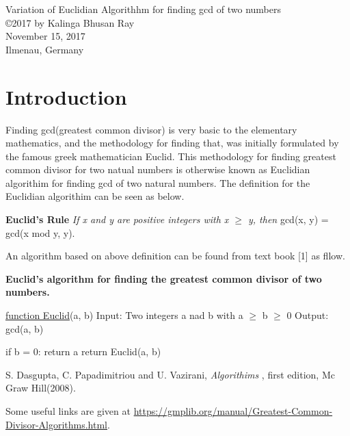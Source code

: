 \documentclass[12pt]{article}
\begin{document}
\begin{center}
{\large Variation of Euclidian Algorithhm for finding gcd of two numbers} \\
\copyright 2017 by Kalinga Bhusan Ray \\
November 15, 2017 \\
Ilmenau, Germany \\
\author{Kalinga Bhusan Ray}
\end{center}

\section{Introduction}
Finding gcd(greatest common divisor) is very basic to the elementary mathematics, 
and the methodology for finding that, was initially formulated by the famous greek mathematician Euclid. This methodology for finding greatest common divisor for two natual numbers is otherwise known as Euclidian algorithim for finding gcd of two 
natural numbers. The definition for the Euclidian algorithim can be seen as below.

\textbf {Euclid's Rule} \textit {If x and y are positive integers with x $\geq$ y,
 then} \break \vspace{0mm} \hspace{4cm} gcd(x, y) = gcd(x mod y, y).

An algorithm based on above definition can be found from text book [1] as fllow.

\textbf {Euclid's algorithm for finding the greatest common divisor of two numbers.}

\underline {function Euclid}(a, b)
Input: Two integers a nad b with a $\geq$ b $\geq$ 0
Output: gcd(a, b)

if b = 0: return a
return Euclid(a, b)


\begin{thebibliography}{6}

S. Dasgupta, C. Papadimitriou and U. Vazirani, \textsl{Algorithims
},
first edition, Mc Graw Hill(2008).

Some useful links are given at \url{https://gmplib.org/manual/Greatest-Common-Divisor-Algorithms.html}.

\end{thebibliography}
\end{document}
